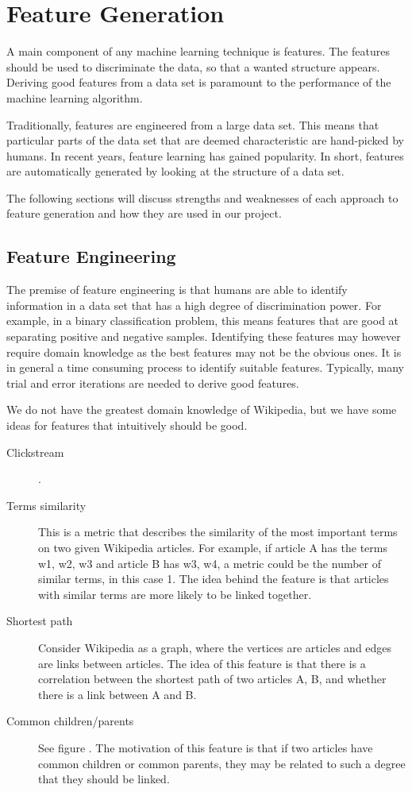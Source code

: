 \section{Feature Generation}
A main component of any machine learning technique is features. The features should be used to discriminate the data, so that a wanted structure appears. Deriving good features from a data set is paramount to the performance of the machine learning algorithm.

Traditionally, features are engineered from a large data set. This means that particular parts of the data set that are deemed characteristic are hand-picked by humans. In recent years, feature learning has gained popularity. In short, features are automatically generated by looking at the structure of a data set.

The following sections will discuss strengths and weaknesses of each approach to feature generation and how they are used in our project.

\subsection{Feature Engineering}
The premise of feature engineering is that humans are able to identify information in a data set that has a high degree of discrimination power. For example, in a binary classification problem, this means features that are good at separating positive and negative samples. Identifying these features may however require domain knowledge as the best features may not be the obvious ones. It is in general a time consuming process to identify suitable features. Typically, many trial and error iterations are needed to derive good features.

We do not have the greatest domain knowledge of Wikipedia, but we have some ideas for features that intuitively should be good. 

\begin{description}
    \item[Clickstream] .
    \item[Terms similarity] This is a metric that describes the similarity of the most important terms on two given Wikipedia articles. For example, if article A has the terms w1, w2, w3 and article B has w3, w4, a metric could be the number of similar terms, in this case 1. The idea behind the feature is that articles with similar terms are more likely to be linked together.
    \item[Shortest path] Consider Wikipedia as a graph, where the vertices are articles and edges are links between articles. The idea of this feature is that there is a correlation between the shortest path of two articles A, B, and whether there is a link between A and B. 
    \item[Common children/parents] See figure . The motivation of this feature is that if two articles have common children or common parents, they may be related to such a degree that they should be linked.
\end{description}

